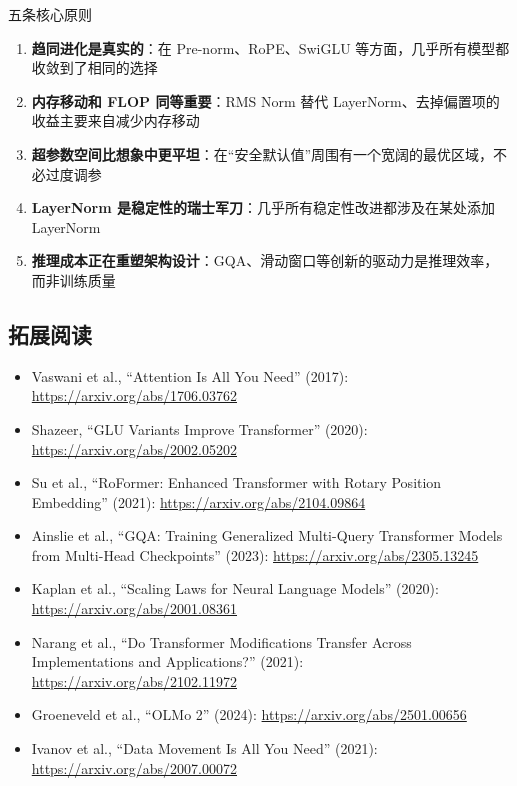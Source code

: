 \documentclass[a4paper]{article}
\begin{document}
\begin{importantbox}{五条核心原则}
\begin{enumerate}
    \item \textbf{趋同进化是真实的}：在 Pre-norm、RoPE、SwiGLU 等方面，几乎所有模型都收敛到了相同的选择
    \item \textbf{内存移动和 FLOP 同等重要}：RMS Norm 替代 LayerNorm、去掉偏置项的收益主要来自减少内存移动
    \item \textbf{超参数空间比想象中更平坦}：在``安全默认值''周围有一个宽阔的最优区域，不必过度调参
    \item \textbf{LayerNorm 是稳定性的瑞士军刀}：几乎所有稳定性改进都涉及在某处添加 LayerNorm
    \item \textbf{推理成本正在重塑架构设计}：GQA、滑动窗口等创新的驱动力是推理效率，而非训练质量
\end{enumerate}
\end{importantbox}

\subsection{拓展阅读}

\begin{itemize}
    \item Vaswani et al., ``Attention Is All You Need'' (2017): \url{https://arxiv.org/abs/1706.03762}
    \item Shazeer, ``GLU Variants Improve Transformer'' (2020): \url{https://arxiv.org/abs/2002.05202}
    \item Su et al., ``RoFormer: Enhanced Transformer with Rotary Position Embedding'' (2021): \url{https://arxiv.org/abs/2104.09864}
    \item Ainslie et al., ``GQA: Training Generalized Multi-Query Transformer Models from Multi-Head Checkpoints'' (2023): \url{https://arxiv.org/abs/2305.13245}
    \item Kaplan et al., ``Scaling Laws for Neural Language Models'' (2020): \url{https://arxiv.org/abs/2001.08361}
    \item Narang et al., ``Do Transformer Modifications Transfer Across Implementations and Applications?'' (2021): \url{https://arxiv.org/abs/2102.11972}
    \item Groeneveld et al., ``OLMo 2'' (2024): \url{https://arxiv.org/abs/2501.00656}
    \item Ivanov et al., ``Data Movement Is All You Need'' (2021): \url{https://arxiv.org/abs/2007.00072}
\end{itemize}
\end{document}
